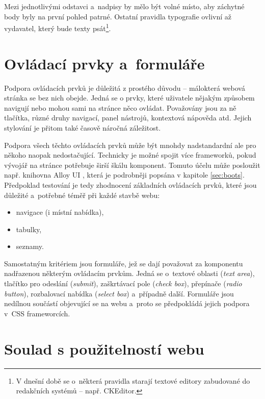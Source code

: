 \documentclass[thesis=B,czech]{FITthesis}[2012/06/26]
\begin{document}
Mezi jednotlivými odstavci a~nadpisy by mělo být volné místo, aby záchytné body byly na první pohled patrné. Ostatní pravidla typografie ovlivní až vydavatel, který bude texty psát\footnote{V dnešní době se o~některá pravidla starají textové editory zabudované do redakčních systémů -- např. CKEditor.}. 



\section{Ovládací prvky a~formuláře}



Podpora ovládacích prvků je důležitá z prostého důvodu -- málokterá webová stránka se bez nich obejde. Jedná se o prvky, které uživatele nějakým způsobem navigují nebo mohou sami na stránce něco ovládat. Považovány jsou za ně tlačítka, různé druhy navigací, panel nástrojů, kontextová nápověda atd. Jejich stylování je přitom také časově náročná záležitost.  

Podpora všech těchto ovládacích prvků může být mnohdy nadstandardní ale pro někoho naopak nedostačující. Technicky je možné spojit více frameworků, pokud vývojář na stránce potřebuje širší škálu komponent. Tomuto účelu může posloužit např. knihovna Alloy UI , která je podrobněji popsána v kapitole \ref{sec:boots}. Předpoklad testování je tedy zhodnocení základních ovládacích prvků, které jsou důležité a~potřebné téměř při každé stavbě webu:

\begin{itemize}
 \item navigace (i místní nabídka),
 \item tabulky,
 \item seznamy.
\end{itemize}

Samostatným kritériem jsou formuláře, jež se dají považovat za komponentu nadřazenou některým ovládacím prvkům. Jedná se o~textové oblasti (\textit{text area}), tlačítko pro odeslání (\textit{submit}), zaškrtávací pole (\textit{check box}), přepínače (\textit{radio button}), rozbalovací nabídka (\textit{select box}) a~případně další. Formuláře jsou nedílnou součástí objevující se na webu a~proto se předpokládá jejich podpora v~\gls{CSS} frameworcích.

\section{Soulad s použitelností webu}
\end{document}
